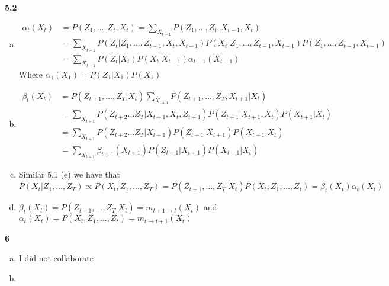 \documentclass{article}
\begin{document}
\textbf{5.2}\begin{enumerate}[(a)]
    \item 
    \begin{align*}
        \alpha_t(X_t) &= P(Z_1, \dots, Z_t, X_t) = \sum_{X_{t - 1}}P(Z_1, \dots, Z_t, X_{t - 1}, X_t) \\
        &= \sum_{X_{t - 1}}P(Z_t |Z_1, \dots, Z_{t - 1}, X_t, X_{t - 1}) P(X_t | Z_1, \dots, Z_{t - 1}, X_{t - 1}) P(Z_1, \dots, Z_{t - 1}, X_{t - 1}) \\
        &= \sum_{X_{t - 1}}P(Z_t | X_t) P(X_t | X_{t - 1}) \alpha_{t - 1}(X_{t - 1})
    \end{align*}
    Where $\alpha_1(X_1) = P(Z_1 | X_1) P(X_1)$
    \item \begin{align*}
        \beta_t(X_t) &= P(Z_{t + 1}, \dots, Z_T | X_t)\sum_{X_{t + 1}}P(Z_{t + 1}, \dots, Z_T, X_{t + 1} | X_t) \\ 
        &= \sum_{X_{t + 1}}P(Z_{t + 2} \dots Z_T | X_{t + 1}, X_t, Z_{t + 1}) P(Z_{t + 1} | X_{t + 1}, X_{t})P(X_{t + 1} | X_{t}) \\
        &= \sum_{X_{t + 1}}P(Z_{t + 2} \dots Z_T | X_{t + 1}) P(Z_{t + 1} | X_{t + 1})P(X_{t + 1} | X_{t}) \\ 
        &= \sum_{X_{t + 1}}\beta_{t + 1}(X_{t + 1}) P(Z_{t + 1} | X_{t + 1})P(X_{t + 1} | X_{t})
    \end{align*}
    \item Similar 5.1 (e) we have that  $P(X_t | Z_1, \dots , Z_T) \propto P(X_t, Z_1,\dots,Z_T) = P(Z_{t + 1}, \dots , Z_T | X_t)P(X_t, Z_1, \dots,Z_t) = \beta_t(X_t)\alpha_t(X_t)$
    \item $\beta_t(X_t) = P(Z_{t + 1}, \dots , Z_T | X_t) = m_{t + 1 \rightarrow t}(X_t)$ and $\alpha_t(X_t) = P(X_t, Z_1, \dots,Z_t) = m_{t \rightarrow t + 1}(X_t)$
\end{enumerate}
\textbf{6}\begin{enumerate}[(a)]
    \item I did not collaborate 
    \item 
\end{enumerate}
\end{document}
